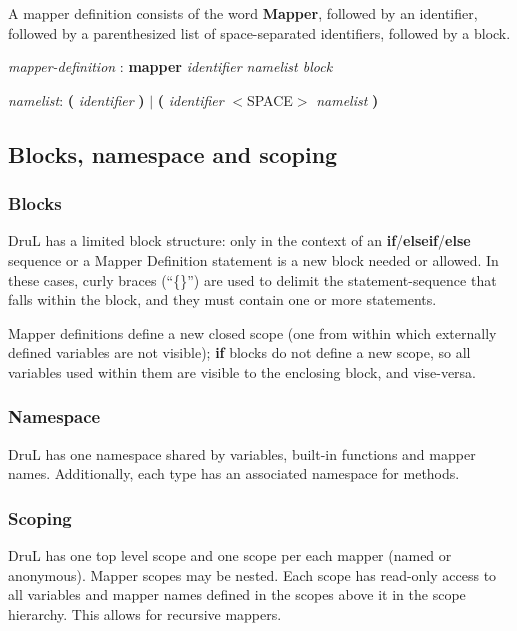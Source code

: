 A mapper definition consists of the word \textbf{Mapper}, followed by an identifier, followed by a parenthesized list of space-separated identifiers, followed by a block.

\emph{mapper-definition} : \textbf{mapper} \emph{identifier namelist block} 

\emph{namelist}: \textbf ( \emph{identifier} \textbf ) $|$  \textbf ( \emph{identifier} 
$<$SPACE$>$ \emph{namelist} \textbf )


\subsection{Blocks, namespace and scoping}

\subsubsection{Blocks}

DruL has a limited block structure: only in the context of an \textbf{if}/\textbf{elseif}/\textbf{else} sequence or a Mapper Definition statement is a new block needed or allowed.  In these cases, curly braces (``\{\}'') are used to delimit the statement-sequence that falls within the block, and they must contain one or more statements.

Mapper definitions define a new closed scope (one from within which externally defined variables are not visible); \textbf{if} blocks do not define a new scope, so all variables used within them are visible to the enclosing  block, and vise-versa.

\subsubsection{Namespace}

DruL has one namespace shared by variables, built-in functions and 
mapper names. Additionally, each type has an associated namespace for methods.

\subsubsection{Scoping}

DruL has one top level scope and one scope per each mapper
(named or anonymous). Mapper scopes may be nested.
Each scope has read-only access to all variables and mapper names
defined in the scopes above it in the scope hierarchy.
This allows for recursive mappers.






